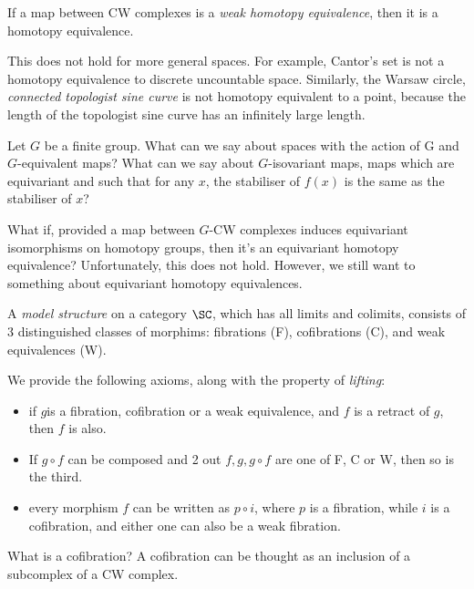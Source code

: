 \documentclass[11pt]{scrartcl}
\begin{document}
\begin{theorem}
  If a map between CW complexes is a \textit{weak homotopy
    equivalence}, then it is a homotopy equivalence.
\end{theorem}

\begin{remark}
  This does not hold for more general spaces. For example, Cantor's
  set is not a homotopy equivalence to discrete uncountable
  space. Similarly, the Warsaw circle, \textit{connected topologist sine curve} is
  not homotopy equivalent to a point, because the length of the
  topologist sine curve has an infinitely large length.
\end{remark}

Let $G$ be a finite group. What can we say about spaces with the
action of G and $G$-equivalent maps? What can we say about
$G$-isovariant maps, maps which are equivariant and such that for any
$x$, the stabiliser of $f(x)$ is the same as the stabiliser of $x$?

What if, provided a map between $G$-CW complexes induces equivariant
isomorphisms on homotopy groups, then it's an equivariant homotopy
equivalence? Unfortunately, this does not hold. However, we still want
to something about equivariant homotopy equivalences.

\begin{definition}
  A \textit{model structure} on a category $\SC$, which has all limits
  and colimits, consists of $3$ distinguished classes of morphims:
  fibrations (F), cofibrations (C), and weak equivalences (W).
\end{definition}

We provide the following axioms, along with the property of
\textit{lifting}:

\begin{itemize}
\item if $g$is a fibration, cofibration or a weak equivalence, and $f$
  is a retract of $g$, then $f$ is also.
\item If $g\circ f$ can be composed and 2 out $f, g, g\circ f$ are one
  of F, C or W, then so is the third.
\item every morphism $f$ can be written as $p\circ i$, where $p$ is a
  fibration, while $i$ is a cofibration, and either one can also be a
  weak fibration.
\end{itemize}
\begin{remark}
  What is a cofibration? A cofibration can be thought as an inclusion
  of a subcomplex of a CW complex.
\end{remark}
\end{document}
